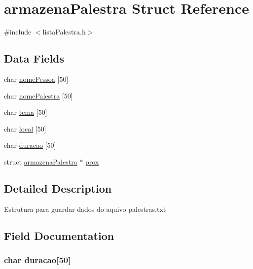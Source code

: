 \hypertarget{structarmazena_palestra}{}\section{armazena\+Palestra Struct Reference}
\label{structarmazena_palestra}


{\ttfamily \#include $<$lista\+Palestra.\+h$>$}

\subsection*{Data Fields}
\begin{DoxyCompactItemize}
\item 
char \hyperlink{structarmazena_palestra_a7e57f32a19542df417023d2b4cff078c}{nome\+Pessoa} \mbox{[}50\mbox{]}
\item 
char \hyperlink{structarmazena_palestra_ae4f7805c01d2a96c7e8abd996cc25a6d}{nome\+Palestra} \mbox{[}50\mbox{]}
\item 
char \hyperlink{structarmazena_palestra_a8be1f3ec3ae84dc6afee3ab87483612e}{tema} \mbox{[}50\mbox{]}
\item 
char \hyperlink{structarmazena_palestra_ad0fbc2e59205ea604d8a9bac33ed9473}{local} \mbox{[}50\mbox{]}
\item 
char \hyperlink{structarmazena_palestra_ae0b35c399889e7c6f5cd9fbd9230b295}{duracao} \mbox{[}50\mbox{]}
\item 
struct \hyperlink{structarmazena_palestra}{armazena\+Palestra} $\ast$ \hyperlink{structarmazena_palestra_a6a6d4389cfbe251aee591f3c48d17a15}{prox}
\end{DoxyCompactItemize}


\subsection{Detailed Description}
Estrutura para guardar dados do aquivo \textquotesingle{}palestras.\+txt\textquotesingle{} 

\subsection{Field Documentation}
\hypertarget{structarmazena_palestra_ae0b35c399889e7c6f5cd9fbd9230b295}{}
\subsubsection[{duracao}]{\setlength{\rightskip}{0pt plus 5cm}char duracao\mbox{[}50\mbox{]}}\label{structarmazena_palestra_ae0b35c399889e7c6f5cd9fbd9230b295}
\hypertarget{structarmazena_palestra_ad0fbc2e59205ea604d8a9bac33ed9473}{}
